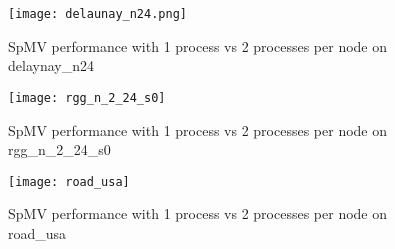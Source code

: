 \begin{figure}[H]
    \centering
    \texttt{[image: delaunay\_n24.png]}
    \caption{SpMV performance with 1 process vs 2 processes per node on delaynay\_n24}
    \label{fig:delaunayflops}
\end{figure}

\begin{figure}[H]
    \begin{center}
        \texttt{[image: rgg\_n\_2\_24\_s0]}
    \end{center}
    \caption{SpMV performance with 1 process vs 2 processes per node on rgg\_n\_2\_24\_s0}
    \label{fig:rgg_n_2_24_s0}
\end{figure}

\begin{figure}[H]
    \begin{center}
        \texttt{[image: road\_usa]}
    \end{center}
    \caption{SpMV performance with 1 process vs 2 processes per node on road\_usa}
    \label{fig:road_usa}
\end{figure}




